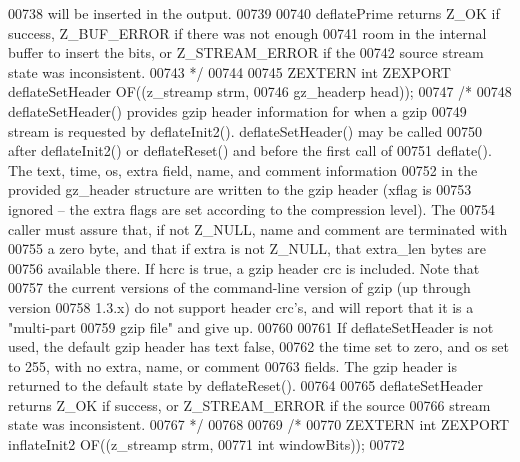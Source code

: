 \begin{DoxyCode}
00738 \textcolor{comment}{   will be inserted in the output.}
00739 \textcolor{comment}{}
00740 \textcolor{comment}{     deflatePrime returns Z\_OK if success, Z\_BUF\_ERROR if there was not enough}
00741 \textcolor{comment}{   room in the internal buffer to insert the bits, or Z\_STREAM\_ERROR if the}
00742 \textcolor{comment}{   source stream state was inconsistent.}
00743 \textcolor{comment}{*/}
00744 
00745 ZEXTERN \textcolor{keywordtype}{int} ZEXPORT deflateSetHeader OF((z\_streamp strm,
00746                                          gz\_headerp head));
00747 \textcolor{comment}{/*}
00748 \textcolor{comment}{     deflateSetHeader() provides gzip header information for when a gzip}
00749 \textcolor{comment}{   stream is requested by deflateInit2().  deflateSetHeader() may be called}
00750 \textcolor{comment}{   after deflateInit2() or deflateReset() and before the first call of}
00751 \textcolor{comment}{   deflate().  The text, time, os, extra field, name, and comment information}
00752 \textcolor{comment}{   in the provided gz\_header structure are written to the gzip header (xflag is}
00753 \textcolor{comment}{   ignored -- the extra flags are set according to the compression level).  The}
00754 \textcolor{comment}{   caller must assure that, if not Z\_NULL, name and comment are terminated with}
00755 \textcolor{comment}{   a zero byte, and that if extra is not Z\_NULL, that extra\_len bytes are}
00756 \textcolor{comment}{   available there.  If hcrc is true, a gzip header crc is included.  Note that}
00757 \textcolor{comment}{   the current versions of the command-line version of gzip (up through version}
00758 \textcolor{comment}{   1.3.x) do not support header crc's, and will report that it is a "multi-part}
00759 \textcolor{comment}{   gzip file" and give up.}
00760 \textcolor{comment}{}
00761 \textcolor{comment}{     If deflateSetHeader is not used, the default gzip header has text false,}
00762 \textcolor{comment}{   the time set to zero, and os set to 255, with no extra, name, or comment}
00763 \textcolor{comment}{   fields.  The gzip header is returned to the default state by deflateReset().}
00764 \textcolor{comment}{}
00765 \textcolor{comment}{     deflateSetHeader returns Z\_OK if success, or Z\_STREAM\_ERROR if the source}
00766 \textcolor{comment}{   stream state was inconsistent.}
00767 \textcolor{comment}{*/}
00768 
00769 \textcolor{comment}{/*}
00770 \textcolor{comment}{ZEXTERN int ZEXPORT inflateInit2 OF((z\_streamp strm,}
00771 \textcolor{comment}{                                     int  windowBits));}
00772 \textcolor{comment}{}

\end{DoxyCode}
